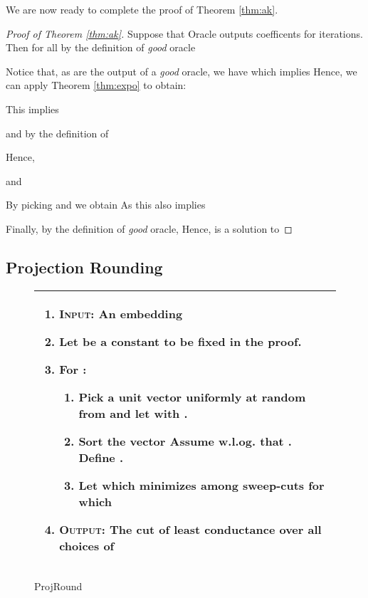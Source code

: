 \documentclass[twoside,leqno,twocolumn]{article}
\numberwithin{equation}{section}
\begin{document}
We are now ready to complete the proof of Theorem \ref{thm:ak}.                                                                                                                                                                                                                                                                                                                                                                                               \begin{proof}[Proof of Theorem \ref{thm:ak}]
Suppose that {\sc Oracle}\xspace outputs coefficents  for  iterations.
Then for all  by the definition of {\it good} oracle 

Notice that, as  are the output of a {\it good} oracle, we have
 which implies 
Hence, we can apply Theorem \ref{thm:expo} to obtain:

This implies

and by the definition of 

Hence,

and

By picking  and  we obtain 
As  this also implies

Finally, by the definition of {\it good} oracle,  Hence,  is a solution to 
\end{proof}

\subsection{Projection Rounding}\label{app:round}

\begin{figure*}[h]
  \begin{tabularx}{\textwidth}{|X|}
    \hline
  \begin{enumerate}
  \item {\bf \textsc{Input:}} An embedding  
  \item Let  be a constant to be fixed in the proof. 
\item For :
\begin{enumerate}
\item Pick a unit vector  uniformly at random from  and let  with .
\item Sort the vector  Assume w.l.og. that . Define .
   
  \item  Let  which minimizes
   among sweep-cuts for which  
\end{enumerate}
\item {\bf \textsc{Output:}} The cut  of least conductance over all choices of  
  \end{enumerate}\\
   \hline
    \end{tabularx}

  \caption{{\sc ProjRound}}
  \label{fig:rounding}
\end{figure*}
\end{document}

